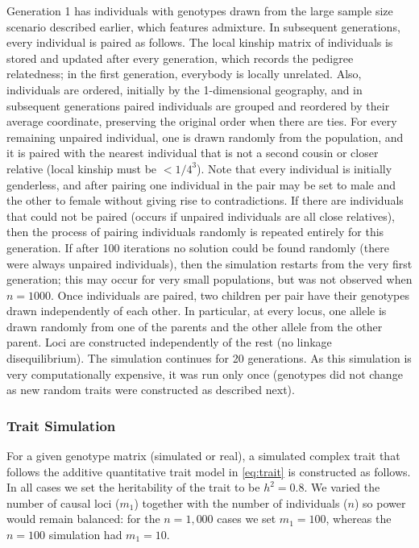 \documentclass[11pt]{article}
\begin{document}
Generation 1 has individuals with genotypes drawn from the large sample size scenario described earlier, which features admixture.
In subsequent generations, every individual is paired as follows.
The local kinship matrix of individuals is stored and updated after every generation, which records the pedigree relatedness; in the first generation, everybody is locally unrelated.
Also, individuals are ordered, initially by the 1-dimensional geography, and in subsequent generations paired individuals are grouped and reordered by their average coordinate, preserving the original order when there are ties.
For every remaining unpaired individual, one is drawn randomly from the population, and it is paired with the nearest individual that is not a second cousin or closer relative (local kinship must be $< 1/4^3$).
Note that every individual is initially genderless, and after pairing one individual in the pair may be set to male and the other to female without giving rise to contradictions.
If there are individuals that could not be paired (occurs if unpaired individuals are all close relatives), then the process of pairing individuals randomly is repeated entirely for this generation.
If after 100 iterations no solution could be found randomly (there were always unpaired individuals), then the simulation restarts from the very first generation; this may occur for very small populations, but was not observed when $n = 1000$.
Once individuals are paired, two children per pair have their genotypes drawn independently of each other.
In particular, at every locus, one allele is drawn randomly from one of the parents and the other allele from the other parent.
Loci are constructed independently of the rest (no linkage disequilibrium).
The simulation continues for 20 generations.
As this simulation is very computationally expensive, it was run only once (genotypes did not change as new random traits were constructed as described next).

\subsubsection{Trait Simulation}

For a given genotype matrix (simulated or real), a simulated complex trait that follows the additive quantitative trait model in \cref{eq:trait} is constructed as follows.
In all cases we set the heritability of the trait to be $h^2 = 0.8$.
We varied the number of causal loci ($m_1$) together with the number of individuals ($n$) so power would remain balanced:
for the $n = 1,000$ cases we set $m_1 = 100$, whereas the $n = 100$ simulation had $m_1 = 10$.
\end{document}
